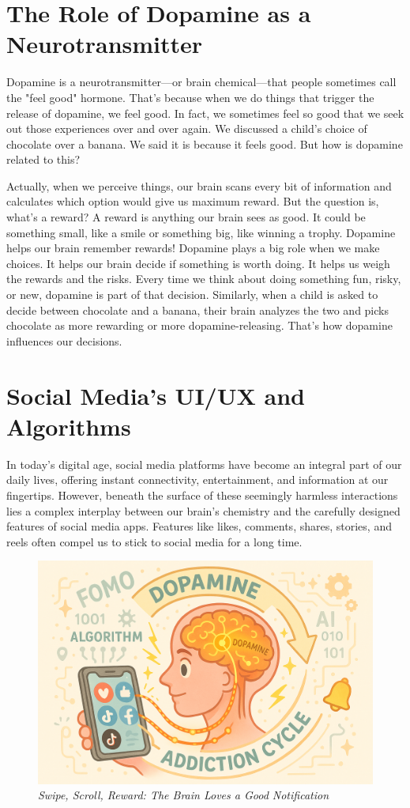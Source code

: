 \documentclass[a4paper,10pt,twocolumn]{memoir}
\begin{document}
{\section*{The Role of Dopamine as a Neurotransmitter}

Dopamine is a neurotransmitter—or brain chemical—that people sometimes call the "feel good" hormone. That's because when we do things that trigger the release of dopamine, we feel good. In fact, we sometimes feel so good that we seek out those experiences over and over again. We discussed a child’s choice of chocolate over a banana. We said it is because it feels good. But how is dopamine related to this?

Actually, when we perceive things, our brain scans every bit of information and calculates which option would give us maximum reward. But the question is, what’s a reward? A reward is anything our brain sees as good. It could be something small, like a smile or something big, like winning a trophy. Dopamine helps our brain remember rewards! Dopamine plays a big role when we make choices. It helps our brain decide if something is worth doing. It helps us weigh the rewards and the risks. Every time we think about doing something fun, risky, or new, dopamine is part of that decision. Similarly, when a child is asked to decide between chocolate and a banana, their brain analyzes the two and picks chocolate as more rewarding or more dopamine-releasing. That’s how dopamine influences our decisions.

\section*{Social Media’s UI/UX and Algorithms}

In today’s digital age, social media platforms have become an integral part of our daily lives, offering instant connectivity, entertainment, and information at our fingertips. However, beneath the surface of these seemingly harmless interactions lies a complex interplay between our brain’s chemistry and the carefully designed features of social media apps. Features like likes, comments, shares, stories, and reels often compel us to stick to social media for a long time.

\begin{figure}[h!]
  \centering
  \includegraphics[width=0.9\linewidth]{brended.png}
  \caption*{\textit{Swipe, Scroll, Reward: The Brain Loves a Good Notification}}
\end{figure}

}
\end{document}

